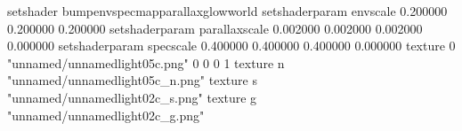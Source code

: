 setshader bumpenvspecmapparallaxglowworld
setshaderparam envscale 0.200000 0.200000 0.200000
setshaderparam parallaxscale 0.002000 0.002000 0.002000 0.000000
setshaderparam specscale 0.400000 0.400000 0.400000 0.000000
texture 0 "unnamed/unnamedlight05c.png" 0 0 0 1
texture n "unnamed/unnamedlight05c_n.png"
texture s "unnamed/unnamedlight02c_s.png"
texture g "unnamed/unnamedlight02c_g.png"